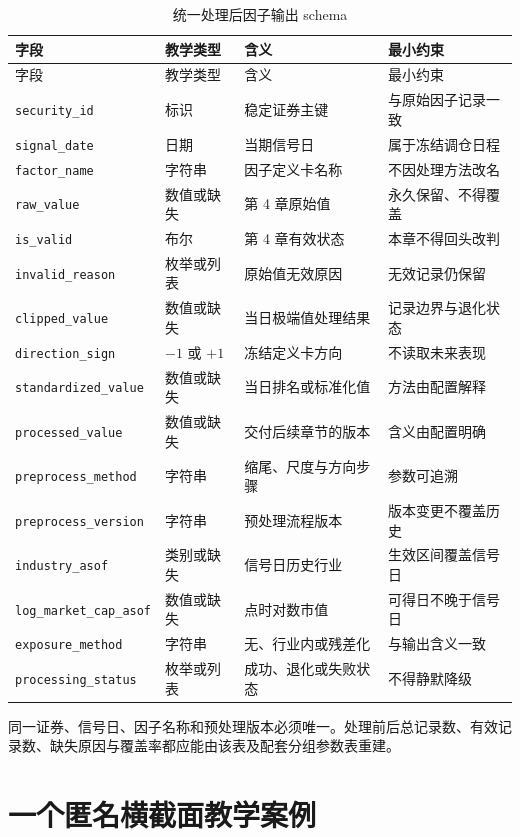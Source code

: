 {
\setlength{\tabcolsep}{3pt}
\small
\begin{longtable}{p{3.4cm} p{2.25cm} p{5.05cm} p{4.1cm}}
\caption{统一处理后因子输出 schema}\label{tab:ch05-output-schema}\\
\toprule
字段 & 教学类型 & 含义 & 最小约束 \\
\midrule
\endfirsthead
\toprule
字段 & 教学类型 & 含义 & 最小约束 \\
\midrule
\endhead
\texttt{security\_id} & 标识 & 稳定证券主键 & 与原始因子记录一致 \\
\texttt{signal\_date} & 日期 & 当期信号日 & 属于冻结调仓日程 \\
\texttt{factor\_name} & 字符串 & 因子定义卡名称 & 不因处理方法改名 \\
\texttt{raw\_value} & 数值或缺失 & 第 4 章原始值 & 永久保留、不得覆盖 \\
\texttt{is\_valid} & 布尔 & 第 4 章有效状态 & 本章不得回头改判 \\
\texttt{invalid\_reason} & 枚举或列表 & 原始值无效原因 & 无效记录仍保留 \\
\texttt{clipped\_value} & 数值或缺失 & 当日极端值处理结果 & 记录边界与退化状态 \\
\texttt{direction\_sign} & \(-1\) 或 \(+1\) & 冻结定义卡方向 & 不读取未来表现 \\
\texttt{standardized\_value} & 数值或缺失 & 当日排名或标准化值 & 方法由配置解释 \\
\texttt{processed\_value} & 数值或缺失 & 交付后续章节的版本 & 含义由配置明确 \\
\texttt{preprocess\_method} & 字符串 & 缩尾、尺度与方向步骤 & 参数可追溯 \\
\texttt{preprocess\_version} & 字符串 & 预处理流程版本 & 版本变更不覆盖历史 \\
\texttt{industry\_asof} & 类别或缺失 & 信号日历史行业 & 生效区间覆盖信号日 \\
\texttt{log\_market\_cap\_asof} & 数值或缺失 & 点时对数市值 & 可得日不晚于信号日 \\
\texttt{exposure\_method} & 字符串 & 无、行业内或残差化 & 与输出含义一致 \\
\texttt{processing\_status} & 枚举或列表 & 成功、退化或失败状态 & 不得静默降级 \\
\bottomrule
\end{longtable}
}

同一证券、信号日、因子名称和预处理版本必须唯一。处理前后总记录数、有效记录数、缺失原因与覆盖率都应能由该表及配套分组参数表重建。

\section{一个匿名横截面教学案例}

